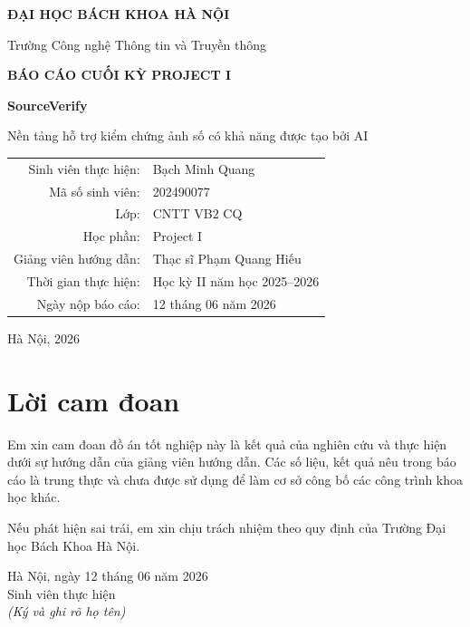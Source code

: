 \documentclass[14pt,a4paper,oneside]{report}
\begin{document}

\begin{titlepage}
\centering
{\Large\bfseries ĐẠI HỌC BÁCH KHOA HÀ NỘI\par}
\vspace{0.35cm}
{\large Trường Công nghệ Thông tin và Truyền thông\par}
\vspace{1.8cm}
{\Large\bfseries BÁO CÁO CUỐI KỲ PROJECT I\par}
\vspace{0.8cm}
{\Huge\bfseries SourceVerify\par}
\vspace{0.35cm}
{\Large Nền tảng hỗ trợ kiểm chứng ảnh số có khả năng được tạo bởi AI\par}
\vspace{1.6cm}
\begin{tabular}{rl}
Sinh viên thực hiện: & Bạch Minh Quang \\
Mã số sinh viên: & 202490077 \\
Lớp: & CNTT VB2 CQ \\
Học phần: & Project I \\
Giảng viên hướng dẫn: & Thạc sĩ Phạm Quang Hiếu \\
Thời gian thực hiện: & Học kỳ II năm học 2025--2026 \\
Ngày nộp báo cáo: & 12 tháng 06 năm 2026 \\
\end{tabular}
\vfill
{\large Hà Nội, 2026\par}
\end{titlepage}

\chapter*{Lời cam đoan}
Em xin cam đoan đồ án tốt nghiệp này là kết quả của nghiên cứu và thực hiện dưới sự hướng dẫn của giảng viên hướng dẫn. Các số liệu, kết quả nêu trong báo cáo là trung thực và chưa được sử dụng để làm cơ sở công bố các công trình khoa học khác.

Nếu phát hiện sai trái, em xin chịu trách nhiệm theo quy định của Trường Đại học Bách Khoa Hà Nội.

\begin{flushright}
Hà Nội, ngày 12 tháng 06 năm 2026\\
\vspace{1cm}
Sinh viên thực hiện\\
\textit{(Ký và ghi rõ họ tên)}
\end{flushright}
\end{document}
